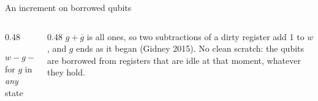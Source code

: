 \documentclass[aspectratio=169,11pt]{beamer}
\newcommand{\code}[2][]{}
\begin{document}
\setcounter{framenumber}{185}
\begin{frame}[fragile]{An increment on borrowed qubits}
  \begin{columns}[c]
    \begin{column}{0.48\textwidth}
      \centering
      \par
      \vskip2mm
      {\small $w-g-\overline g=w+1-2^{|w|}$\\for $g$ in \emph{any} state}
    \end{column}
    \begin{column}{0.48\textwidth}
      \small $g+\overline g$ is all ones, so two subtractions of a dirty register add 1 to $w$, and $g$ ends as it began (Gidney 2015).
      \vskip2mm
      No clean scratch: the qubits are borrowed from registers that are idle at that moment, whatever they hold.
    \end{column}
  \end{columns}
  \vskip2mm
  \code[basicstyle=\ttfamily\scriptsize]{inc_borrowed.py}
\end{frame}
\end{document}
